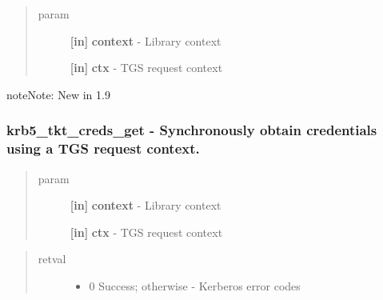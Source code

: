 \documentclass[letterpaper,10pt,english]{sphinxmanual}
\begin{document}
\begin{fulllineitems}
\label{appdev/refs/api/krb5_tkt_creds_free:krb5_tkt_creds_free}
\end{fulllineitems}

\begin{quote}\begin{description}
\item[{param}] \leavevmode
\textbf{{[}in{]}} \textbf{context} - Library context

\textbf{{[}in{]}} \textbf{ctx} - TGS request context

\end{description}\end{quote}

\begin{notice}{note}{Note:}
New in 1.9
\end{notice}


\subsubsection{krb5\_tkt\_creds\_get -  Synchronously obtain credentials using a TGS request context.}
\label{appdev/refs/api/krb5_tkt_creds_get:krb5-tkt-creds-get-synchronously-obtain-credentials-using-a-tgs-request-context}\label{appdev/refs/api/krb5_tkt_creds_get::doc}

\begin{fulllineitems}
\label{appdev/refs/api/krb5_tkt_creds_get:krb5_tkt_creds_get}
\end{fulllineitems}

\begin{quote}\begin{description}
\item[{param}] \leavevmode
\textbf{{[}in{]}} \textbf{context} - Library context

\textbf{{[}in{]}} \textbf{ctx} - TGS request context

\end{description}\end{quote}
\begin{quote}\begin{description}
\item[{retval}] \leavevmode\begin{itemize}
\item {} 
0   Success; otherwise - Kerberos error codes

\end{itemize}

\end{description}\end{quote}
\end{document}
